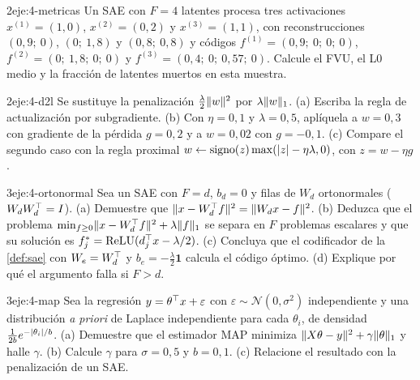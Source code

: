 \begin{ejercicio}{2}{eje:4-metricas}
Un SAE con $F=4$ latentes procesa tres activaciones $x^{(1)}=(1,0)$, $x^{(2)}=(0,2)$ y $x^{(3)}=(1,1)$, con reconstrucciones $(0{,}9;\allowbreak\ 0)$, $(0;\allowbreak\ 1{,}8)$ y $(0{,}8;\allowbreak\ 0{,}8)$ y códigos $f^{(1)}=(0{,}9;\allowbreak\ 0;\allowbreak\ 0;\allowbreak\ 0)$, $f^{(2)}=(0;\allowbreak\ 1{,}8;\allowbreak\ 0;\allowbreak\ 0)$ y $f^{(3)}=(0{,}4;\allowbreak\ 0;\allowbreak\ 0{,}57;\allowbreak\ 0)$. Calcule el FVU, el L0 medio y la fracción de latentes muertos en esta muestra.
\end{ejercicio}

\begin{ejercicio}{2}{eje:4-d2l}
Se sustituye la penalización $\tfrac{\lambda}{2}\lVert w\rVert^{2}$ por $\lambda\lVert w\rVert_1$. (a) Escriba la regla de actualización por subgradiente. (b) Con $\eta=0{,}1$ y $\lambda=0{,}5$, aplíquela a $w=0{,}3$ con gradiente de la pérdida $g=0{,}2$ y a $w=0{,}02$ con $g=-0{,}1$. (c) Compare el segundo caso con la regla proximal $w\leftarrow\operatorname{signo}(z)\max(\lvert z\rvert-\eta\lambda,0)$, con $z=w-\eta g$.
\end{ejercicio}

\begin{ejercicio}{3}{eje:4-ortonormal}
Sea un SAE con $F=d$, $b_d=0$ y filas de $W_d$ ortonormales ($W_dW_d^{\top}=I$). (a) Demuestre que $\lVert x-W_d^{\top} f\rVert^{2}=\lVert W_dx-f\rVert^{2}$. (b) Deduzca que el problema $\min_{f\ge 0}\lVert x-W_d^{\top} f\rVert^{2}+\lambda\lVert f\rVert_1$ se separa en $F$ problemas escalares y que su solución es $f_j^{*}=\operatorname{ReLU}(d_j^{\top} x-\lambda/2)$. (c) Concluya que el codificador de la \cref{def:sae} con $W_e=W_d^{\top}$ y $b_e=-\tfrac{\lambda}{2}\mathbf{1}$ calcula el código óptimo. (d) Explique por qué el argumento falla si $F>d$.
\end{ejercicio}

\begin{ejercicio}{3}{eje:4-map}
Sea la regresión $y=\theta^{\top} x+\varepsilon$ con $\varepsilon\sim\mathcal{N}(0,\sigma^{2})$ independiente y una distribución \emph{a priori} de Laplace independiente para cada $\theta_i$, de densidad $\frac{1}{2b}e^{-\lvert\theta_i\rvert/b}$. (a) Demuestre que el estimador MAP minimiza $\lVert X\theta-y\rVert^{2}+\gamma\lVert\theta\rVert_1$ y halle $\gamma$. (b) Calcule $\gamma$ para $\sigma=0{,}5$ y $b=0{,}1$. (c) Relacione el resultado con la penalización de un SAE.
\end{ejercicio}
